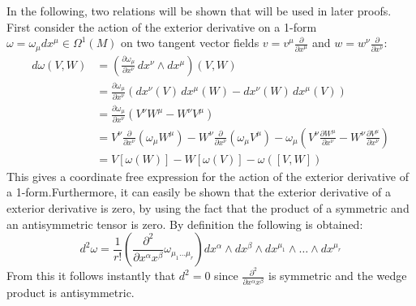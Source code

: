 In the following, two relations will be shown that will be used in later proofs\cite{NakaharaGeometrytopologyphysics2005}. First consider the action of the exterior derivative on a 1-form $\omega=\omega_\mu dx^\mu \in \Omega^1(M)$ on two tangent vector fields $v=v^\mu\frac{\partial}{\partial x^\mu}$ and $w=w^\nu\frac{\partial}{\partial x^\nu}$:
\begin{align*}
  d\omega(V, W) 
  &= \left( \frac{\partial \omega_\mu}{\partial x^\nu} \, dx^\nu \wedge dx^\mu \right)(V, W) \\
  &= \frac{\partial \omega_\mu}{\partial x^\nu} 
  \left( dx^\nu(V) \, dx^\mu(W) - dx^\nu(W) \, dx^\mu(V) \right) \\
  &= \frac{\partial \omega_\mu}{\partial x^\nu} 
  \left( V^\nu W^\mu - W^\nu V^\mu \right) \\
  &= V^\nu \frac{\partial}{\partial x^\nu} \left( \omega_\mu W^\mu \right)
  - W^\nu \frac{\partial}{\partial x^\nu} \left( \omega_\mu V^\mu \right)
  - \omega_\mu \left( V^\nu \frac{\partial W^\mu}{\partial x^\nu} - W^\nu \frac{\partial V^\mu}{\partial x^\nu} \right) \\
  &= V[\omega(W)] - W[\omega(V)] - \omega([V, W])
\end{align*}
This gives a coordinate free expression for the action of the exterior derivative of a 1-form.Furthermore, it can easily be shown that the exterior derivative of a exterior derivative is zero, by using the fact that the product of a symmetric and an antisymmetric tensor is zero. By definition the following is obtained:
\[ d^2\omega = \frac{1}{r!}\left( \frac{\partial^2}{ \partial x^\alpha x^\beta} \omega_{\mu_1 \dots \mu_r} \right) dx^\alpha \wedge dx^\beta \wedge dx^{\mu_1} \wedge \dots \wedge dx^{\mu_r} \]
From this it follows instantly that $d^2=0$ since $\frac{\partial^2}{ \partial x^\alpha x^\beta}$ is symmetric and the wedge product is antisymmetric.

